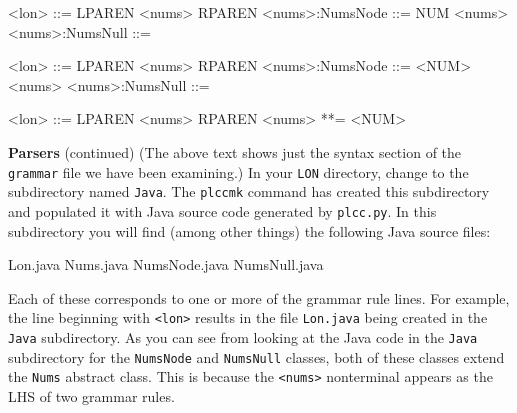 \begin{minipage}[t]{\sw}
\slidenumber
\Large
\begin{SaveVerbatim}{\MYlonGrammarOnly}
<lon>           ::= LPAREN <nums> RPAREN
<nums>:NumsNode ::= NUM <nums>
<nums>:NumsNull ::= 
\end{SaveVerbatim}
\begin{SaveVerbatim}{\MYlonGrammarTOK}
<lon>           ::= LPAREN <nums> RPAREN
<nums>:NumsNode ::= <NUM> <nums>
<nums>:NumsNull ::= 
\end{SaveVerbatim}
\begin{SaveVerbatim}{\MYlonGrammarKleene}
<lon>  ::= LPAREN <nums> RPAREN
<nums> **= <NUM>
\end{SaveVerbatim}
\LARGE
{\bf Parsers} (continued)\exx
\emm\LightBox{\MYlonGrammarOnly}\exx
(The above text shows just the syntax section
of the \verb'grammar' file we have been examining.)
In your \verb'LON' directory,
change to the subdirectory named \verb'Java'.
The \verb'plccmk' command has created this subdirectory
and populated it with Java source code generated by \verb'plcc.py'.
In this subdirectory you will find (among other things)
the following Java source files:
\begin{qv}
Lon.java
Nums.java
NumsNode.java
NumsNull.java
\end{qv}
Each of these corresponds to one or more of the grammar rule lines.
For example, the line beginning with \verb'<lon>'
results in the file \verb'Lon.java' being created
in the \verb'Java' subdirectory.
As you can see from looking at the Java code in the \verb'Java' subdirectory
for the \verb'NumsNode' and \verb'NumsNull' classes,
both of these classes extend the \verb'Nums' abstract class.
This is because the \verb'<nums>' nonterminal
appears as the LHS of two grammar rules.
\end{minipage}
\clearpage
